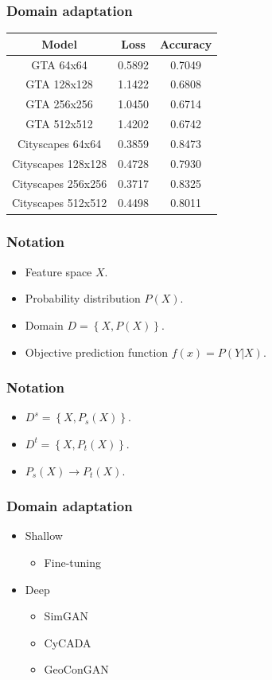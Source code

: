 \documentclass[14pt,aspectratio=169]{beamer}
\begin{document}
\begin{frame}
\frametitle{Domain adaptation}
\begin{center}
  \begin{tabular}{|c|c|c|}\hline
    Model & Loss & Accuracy \\\hline
    GTA 64x64 & 0.5892 & 0.7049 \\\hline
    GTA 128x128 & 1.1422 & 0.6808 \\\hline
    GTA 256x256 & 1.0450 & 0.6714 \\\hline
    GTA 512x512 & 1.4202 & 0.6742 \\\hline
    Cityscapes 64x64 & 0.3859 & 0.8473 \\\hline
    Cityscapes 128x128 & 0.4728 & 0.7930 \\\hline
    Cityscapes 256x256 & 0.3717 & 0.8325 \\\hline
    Cityscapes 512x512 & 0.4498 & 0.8011 \\\hline
  \end{tabular}
\end{center}
\end{frame}

\begin{frame}
\frametitle{Notation}
\begin{itemize}
  \item Feature space $X$.
  \item Probability distribution $P(X)$.
  \item Domain $D = \left\{X, P(X)\right\}$.
  \item Objective prediction function $f(x) = P(Y|X)$.
\end{itemize}
\end{frame}

\begin{frame}
\frametitle{Notation}
\begin{itemize}
  \item $D^s = \left\{X, P_s(X)\right\}$.
  \item $D^t = \left\{X, P_t(X)\right\}$.
  \item $P_s(X) \to P_t(X)$.
\end{itemize}
\end{frame}

\begin{frame}
\frametitle{Domain adaptation}
\begin{itemize}
\item Shallow
\begin{itemize}
  \item Fine-tuning
\end{itemize}
\item Deep
\begin{itemize}
  \item SimGAN
  \item CyCADA
  \item GeoConGAN
\end{itemize}
\end{itemize}
\end{frame}
\end{document}
